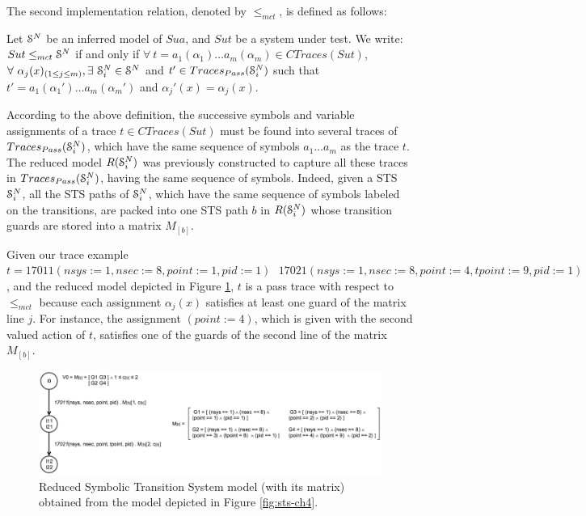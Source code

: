 The second implementation relation, denoted by $\leq_{mct}$, is
defined as follows:

\begin{definition}
     Let $\EuScript{S}^{N}$ be an inferred model of
     $\mathit{Sua}$, and $\mathit{Sut}$ be a system under test.
     We write: ${Sut} \leq_{mct} \EuScript{S}^{N}$ if and only if
     $\forall ~t= a_1(\alpha_1) \dots a_m(\alpha_m) \in
     CTraces({Sut})$, $\forall ~\alpha_j(x)_{(1 \leq j \leq m)},
     \exists ~\EuScript{S}_i^{N} \in \EuScript{S}^{N}$ and $t'
     \in Traces_{Pass}(\EuScript{S}_i^{N})$ such that
     $t'=a_1(\alpha_1') \dots a_m(\alpha_m')$ and
     $\alpha_j'(x)=\alpha_j(x)$.

     \label{impl21}
\end{definition}

According to the above definition, the successive symbols and
variable assignments of a trace $t \in CTraces({Sut})$ must be
found into several traces of $Traces_{Pass}(\EuScript{S}_i^{N})$,
which have the same sequence of symbols $a_1 \dots a_m$ as the
trace $t$. The reduced model $R(\EuScript{S}_i^{N})$ was
previously constructed to capture all these traces in
$Traces_{Pass}(\EuScript{S}_i^{N})$, having the same sequence of
symbols. Indeed, given a STS $\EuScript{S}_i^{N}$, all the STS
paths of $\EuScript{S}_i^{N}$, which have the same sequence of
symbols labeled on the transitions, are packed into one STS path
$b$ in $R(\EuScript{S}_i^{N})$ whose transition guards are stored
into a matrix $M_{[b]}$.

\begin{example}
    Given our trace example $t = 17011(nsys:=1, nsec:=8,
    point:=1, pid:=1)\text{ }17021(nsys:=1, nsec:=8, point:=4,
    tpoint:=9, pid:=1)$, and the reduced model depicted in Figure
    \ref{fig:sts-reduced-ch4}, $t$ is a pass trace with respect
    to $\leq_{mct}$ because each assignment $\alpha_j(x)$
    satisfies at least one guard of the matrix line $j$. For
    instance, the assignment $(point := 4)$, which is given with
    the second valued action of $t$, satisfies one of the guards
    of the second line of the matrix $M_{[b]}$.

    \begin{figure}[h]
        \begin{center}
            \includegraphics[width=1.0\linewidth]{figures/reduced_sts_ch4.png}
        \end{center}

        \caption{Reduced Symbolic Transition System model (with
        its matrix) obtained from the model depicted in Figure
        \ref{fig:sts-ch4}.}
        \label{fig:sts-reduced-ch4}
    \end{figure}
\end{example}

